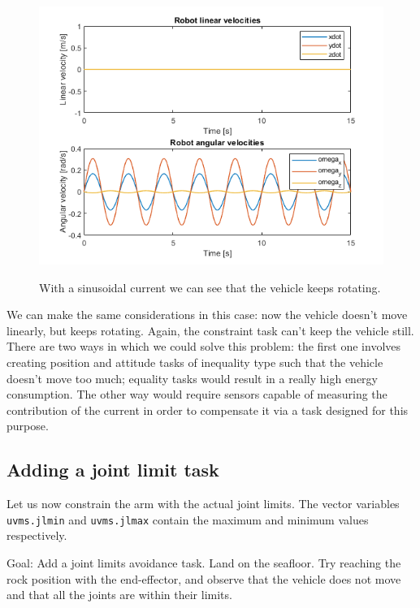 \documentclass{article}
\begin{document}
\begin{figure}[H]
	\centering
	\caption{With a sinusoidal current we can see that the vehicle keeps rotating.}
	\includegraphics[scale=0.55]{images/Ex4/Constraint_WithSinusoidalCurrent_LinAngVel}
	\label{fig:ex4.1.3SinusoidalCurrent}
\end{figure}
We can make the same considerations in this case: now the vehicle doesn't move linearly, but keeps rotating. Again, the constraint task can't keep the vehicle still.\\
There are two ways in which we could solve this problem: the first one involves creating position and attitude tasks of inequality type such that the vehicle doesn't move too much; equality tasks would result in a really high energy consumption. The other way would require sensors capable of measuring the contribution of the current in order to compensate it via a task designed for this purpose.

\subsection{Adding a joint limit task}
Let us now constrain the arm with the actual joint limits. The vector variables \texttt{uvms.jlmin} and \texttt{uvms.jlmax} contain the maximum and minimum values respectively.

Goal: Add a joint limits avoidance task. Land on the seafloor. Try reaching the rock position with the end-effector, and observe that the vehicle does not move and that all the joints are within their limits.

\end{document}
